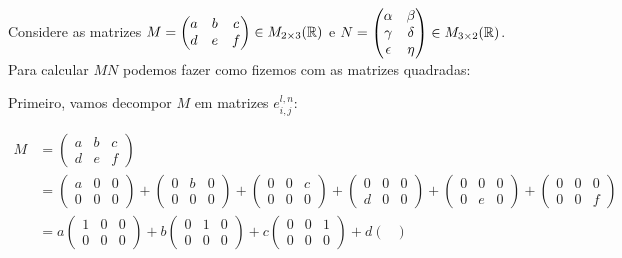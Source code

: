 \begin{ex}
	Considere as matrizes $M=\begin{pmatrix}
	a&b&c\\
	d&e&f
	\end{pmatrix}\in M_{2\times 3}(\mathbb R)$ e $N=\begin{pmatrix}
	\alpha &\beta\\
	\gamma & \delta\\
	\epsilon & \eta	
	\end{pmatrix}\in M_{3\times 2}(\mathbb R)$. Para calcular $MN$ podemos fazer como fizemos com as matrizes quadradas:
	
	Primeiro, vamos decompor $M$ em matrizes $e^{l,n}_{i,j}$:
	
	\begin{align*}
	M&=\begin{pmatrix}
	a&b&c\\
	d&e&f
	\end{pmatrix}\\
	&=\begin{pmatrix}
	a&0&0\\
	0&0&0
	\end{pmatrix}+
	\begin{pmatrix}
	0&b&0\\
	0&0&0
	\end{pmatrix}+
	\begin{pmatrix}
	0&0&c\\
	0&0&0
	\end{pmatrix}+
	\begin{pmatrix}
	0&0&0\\
	d&0&0
	\end{pmatrix}+
	\begin{pmatrix}
	0&0&0\\
	0&e&0
	\end{pmatrix}+
	\begin{pmatrix}
	0&0&0\\
	0&0&f
	\end{pmatrix}\\
	&=a\begin{pmatrix}
	1&0&0\\
	0&0&0
	\end{pmatrix}+b
	\begin{pmatrix}
	0&1&0\\
	0&0&0
	\end{pmatrix}+c
	\begin{pmatrix}
	0&0&1\\
	0&0&0
	\end{pmatrix}+d
	\begin{pmatrix}

\end{pmatrix}
\end{align*}
\end{ex}
